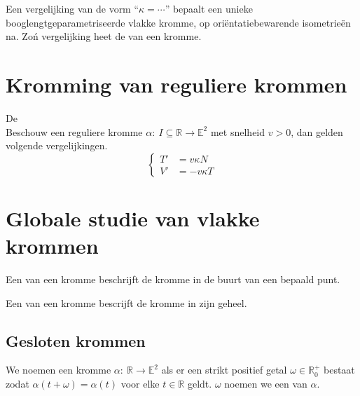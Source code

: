 \documentclass[main.tex]{subfiles}
\begin{document}
\begin{de}
  Een vergelijking van de vorm ``$\kappa = \dotsb$'' bepaalt een unieke booglengtgeparametriseerde vlakke kromme, op ori\"entatiebewarende isometrie\"en na.
  Zo\'n vergelijking heet de  van een kromme.
\end{de}

\section{Kromming van reguliere krommen}
\label{sec:kromm-van-regul}


\begin{st}
  De \\
  Beschouw een reguliere kromme $\alpha:\ I \subseteq \mathbb{R} \rightarrow \mathbb{E}^{2}$ met snelheid $v>0$, dan gelden volgende vergelijkingen.
  \[
  \left\{
    \begin{array}{cl}
      T' &= v\kappa N\\
      V' &= -v\kappa T
    \end{array}
  \right.
  \]
\end{st}

\section{Globale studie van vlakke krommen}
\label{sec:globale-studie-van}

\begin{de}
  Een  van een kromme beschrijft de kromme in de buurt van een bepaald punt.
\end{de}

\begin{de}
  Een  van een kromme bescrijft de kromme in zijn geheel.
\end{de}

\subsection{Gesloten krommen}
\label{sec:gesloten-krommen}

\begin{de}
  We noemen een kromme $\alpha:\ \mathbb{R} \rightarrow \mathbb{E}^{2}$  als er een strikt positief getal $\omega\in \mathbb{R}^{+}_{0}$ bestaat zodat $\alpha(t + \omega) = \alpha(t)$ voor elke $t\in \mathbb{R}$ geldt.
  $\omega$ noemen we een  van $\alpha$.
\end{de}
\end{document}

